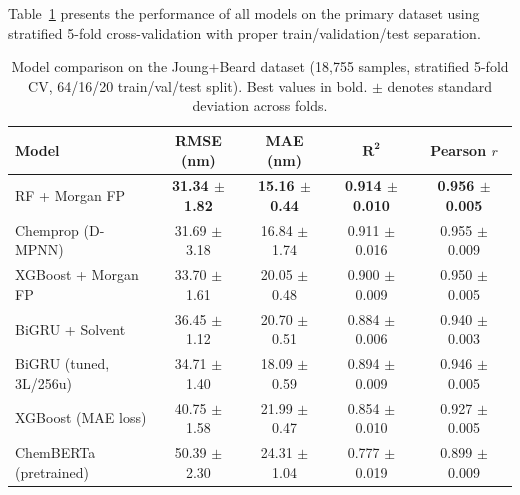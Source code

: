 \documentclass[11pt,a4paper]{article}
\begin{document}
Table~\ref{tab:model_comparison} presents the performance of all models on the primary dataset using stratified 5-fold cross-validation with proper train/validation/test separation.

\begin{table}[t]
\centering
\caption{Model comparison on the Joung+Beard dataset (18,755 samples, stratified 5-fold CV, 64/16/20 train/val/test split). Best values in bold. $\pm$ denotes standard deviation across folds.}
\label{tab:model_comparison}
\begin{tabular}{lcccc}
\toprule
\textbf{Model} & \textbf{RMSE (nm)} & \textbf{MAE (nm)} & $\boldsymbol{R^2}$ & \textbf{Pearson $r$} \\
\midrule
RF + Morgan FP        & \textbf{31.34 $\pm$ 1.82} & \textbf{15.16 $\pm$ 0.44} & \textbf{0.914 $\pm$ 0.010} & \textbf{0.956 $\pm$ 0.005} \\
Chemprop (D-MPNN)     & 31.69 $\pm$ 3.18          & 16.84 $\pm$ 1.74          & 0.911 $\pm$ 0.016          & 0.955 $\pm$ 0.009 \\
XGBoost + Morgan FP   & 33.70 $\pm$ 1.61          & 20.05 $\pm$ 0.48          & 0.900 $\pm$ 0.009          & 0.950 $\pm$ 0.005 \\
BiGRU + Solvent       & 36.45 $\pm$ 1.12          & 20.70 $\pm$ 0.51          & 0.884 $\pm$ 0.006          & 0.940 $\pm$ 0.003 \\
BiGRU (tuned, 3L/256u)& 34.71 $\pm$ 1.40          & 18.09 $\pm$ 0.59          & 0.894 $\pm$ 0.009          & 0.946 $\pm$ 0.005 \\
XGBoost (MAE loss)    & 40.75 $\pm$ 1.58          & 21.99 $\pm$ 0.47          & 0.854 $\pm$ 0.010          & 0.927 $\pm$ 0.005 \\
ChemBERTa (pretrained)& 50.39 $\pm$ 2.30          & 24.31 $\pm$ 1.04          & 0.777 $\pm$ 0.019          & 0.899 $\pm$ 0.009 \\
\bottomrule
\end{tabular}
\end{table}
\end{document}

